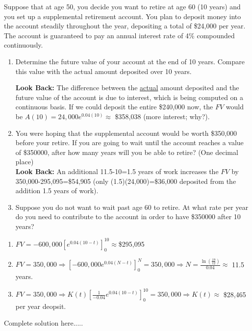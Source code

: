 \begin{example}
Suppose that at age 50, you decide you want to retire at age 60 (10 years) and you set up a supplemental retirement account.  You plan to deposit money into the account steadily throughout the year, depositing a total of \$24,000 per year.  The account is guaranteed to pay an annual interest rate of 4\% compounded continuously. 
    \renewcommand{\labelenumi}{\textbf{(\alph{enumi})}}
    \begin{enumerate}[leftmargin=*]
    \item Determine the future value of your account at the end of 10 years.  Compare this value with the actual amount deposited over 10 years.  \newpage      
    
    \noindent \textbf{Look Back:} The difference between the \underline{actual} amount deposited and the future value of the account is due to interest, which is being computed on a continuous basis. If we could deposit the entire \$240,000 now, the $FV$ would be $A(10)=24,000e^{0.04(10)}\approx $ \$358,038 (more interest; why?).
    
    \item 	You were hoping that the supplemental account would be worth \$350,000 before your retire.  If you are going to wait until the account reaches a value of \$350000, after how many years will you be able to retire?  (One decimal place)  \\
    
    \noindent \textbf{Look Back:} An additional 11.5-10=1.5 years of work increases the $FV$ by 350,000-295,095=\$54,905 (only (1.5)(24,000)=\$36,000 deposited from the addition 1.5 years of work).
    
    \item Suppose you do not want to wait past age 60 to retire.  At what rate per year do you need to contribute to the account in order to have \$350000 after 10 years? 
    \end{enumerate}
    \begin{sol}
        \renewcommand{\labelenumi}{\textbf{(\alph{enumi})}}
    \begin{enumerate}[leftmargin=*]
    \item $FV=-600,000\left[e^{0.04(10-t)}\right]_0^{10}\approx $\$295,095
    \item $FV=350,000\Longrightarrow \left[-600,000e^{0.04(N-t)}\right]_0^N=350,000\Longrightarrow N=\displaystyle\frac{\ln\left(\frac{19}{12}\right)}{0.04}\approx$ 11.5 years.
    \item $FV=350,000\Longrightarrow K(t)\left[\displaystyle\frac{1}{-0.04}e^{0.04(10-t)}\right]_0^{10}=350,000\Longrightarrow K(t)\approx$ \$28,465 per year deopsit.
    \end{enumerate}
    \end{sol}
    \begin{solL}
    Complete solution here.....
    
    \end{solL}
    
\end{example}

